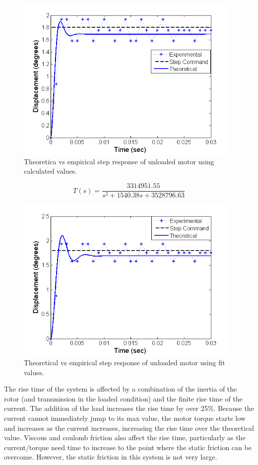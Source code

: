 \documentclass{article}
\theoremstyle{plain}
\theoremstyle{definition}
\theoremstyle{remark}
\begin{document}
\begin{figure}[hbt]
\begin{center}
\includegraphics[width = 11cm]{UnloadedStepUnFit.png}
\caption{Theoretica vs empirical step response of unloaded motor using calculated values.}
\label{q3ai_3}
\end{center}
\end{figure}

\begin{equation}
\label{q3ai_E}
T(s) = \frac{3314951.55}{s^2 + 1540.38 s + 3528796.63}
\end{equation}

\begin{figure}[hbt]
\begin{center}
\includegraphics[width = 11cm]{UnloadedStepFit.png}
\caption{Theoretical vs empirical step response of unloaded motor using fit values.}
\label{q3ai_4}
\end{center}
\end{figure}

The rise time of the system is affected by a combination of the inertia of the rotor (and transmission in the loaded condition) and the finite rise time of the current. The addition of the load increases the rise time by over 25\%. Because the current cannot immediately jump to its max value, the motor torque starts low and increases as the current increases, increasing the rise time over the theoretical value. Viscous and coulomb friction also affect the rise time, particularly as the current/torque need time to increase to the point where the static friction can be overcome. However, the static friction in this system is not very large.\\
\end{document}
